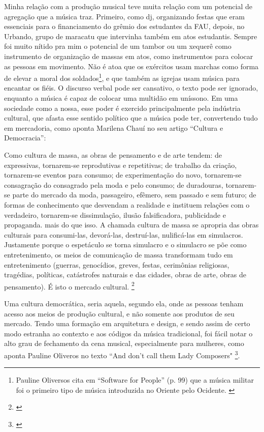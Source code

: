 Minha relação com a produção musical teve muita relação com um potencial de agregação que a música traz. Primeiro, como dj, organizando festas que eram essenciais para o financiamento do grêmio dos estudantes da FAU, depois, no Urbando, grupo de maracatu que intervinha também em atos estudantis. Sempre foi muito nítido pra mim o potencial de um tambor ou um xequerê como instrumento de organização de massas em atos, como instrumentos para colocar as pessoas em movimento. Não é atoa que os exércitos usam marchas como forma de elevar a moral dos soldados\footnote{Pauline Oliversos cita em ``Software for People'' (p. 99) que a música militar foi o primeiro tipo de música introduzida no Oriente pelo Ocidente. \cite{Oliveros2012}}, e que também as igrejas usam música para encantar os fiéis. O discurso verbal pode ser cansativo, o texto pode ser ignorado, enquanto a música é capaz de colocar uma multidão em uníssono. Em uma sociedade como a nossa, esse poder é exercido principalmente pela indústria cultural, que afasta esse sentido político que a música pode ter, convertendo tudo em mercadoria, como aponta Marilena Chauí no seu artigo ``Cultura e Democracia'': 

\begin{citacao}

Como cultura de massa, as obras de pensamento e de arte tendem: de expressivas, tornarem-se reprodutivas e repetitivas; de trabalho da criação, tornarem-se eventos para consumo; de experimentação do novo, tornarem-se consagração do consagrado pela moda e pelo consumo; de duradouras, tornarem-se parte do mercado da moda, passageiro, efêmero, sem passado e sem futuro; de formas de conhecimento que desvendam a realidade e instituem relações com o verdadeiro, tornarem-se dissimulação, ilusão falsificadora, publicidade e propaganda. mais do que isso. A chamada cultura de massa se apropria das obras culturais para consumi-las, devorá-las, destruí-las, nulificá-las em simulacros. Justamente porque o espetáculo se torna simulacro e o simulacro se põe como entretenimento, os meios de comunicação de massa transformam tudo em entretenimento (guerras, genocídios, greves, festas, cerimônias religiosas, tragédias, políticas, catástrofes naturais e das cidades, obras de arte, obras de pensamento). É isto o mercado cultural. \footnote{\cite[61]{MarilenaChaui2008}}
\end{citacao}

Uma cultura democrática, seria aquela, segundo ela, onde as pessoas tenham acesso aos meios de produção cultural, e não somente aos produtos de seu mercado. Tendo uma formação em arquitetura e design, e sendo assim de certo modo estranha ao contexto e aos códigos da música tradicional, foi fácil notar o alto grau de fechamento da cena musical, especialmente para mulheres, como aponta Pauline Oliveros no texto ``And don't call them Lady Composers" \footnote{\cite[48]{Oliveros2012}}. 

